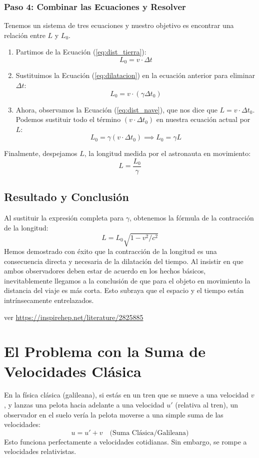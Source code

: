 \documentclass[11pt,a4paper]{article}
\begin{document}
\subsubsection*{Paso 4: Combinar las Ecuaciones y Resolver}
Tenemos un sistema de tres ecuaciones y nuestro objetivo es encontrar una relación entre $L$ y $L_0$.
\begin{enumerate}
    \item Partimos de la Ecuación (\ref{eq:dist_tierra}):
    \[ L_0 = v \cdot \Delta t \]
    \item Sustituimos la Ecuación (\ref{eq:dilatacion}) en la ecuación anterior para eliminar $\Delta t$:
    \[ L_0 = v \cdot (\gamma \Delta t_0) \]
    \item Ahora, observamos la Ecuación (\ref{eq:dist_nave}), que nos dice que $L = v \cdot \Delta t_0$. Podemos sustituir todo el término $(v \cdot \Delta t_0)$ en nuestra ecuación actual por $L$:
    \[ L_0 = \gamma (v \cdot \Delta t_0) \implies L_0 = \gamma L \]
\end{enumerate}
Finalmente, despejamos $L$, la longitud medida por el astronauta en movimiento:
\[ L = \frac{L_0}{\gamma} \]

\subsection*{Resultado y Conclusión}
Al sustituir la expresión completa para $\gamma$, obtenemos la fórmula de la contracción de la longitud:
\[ \boxed{ L = L_0 \sqrt{1 - v^2/c^2} } \]
Hemos demostrado con éxito que la contracción de la longitud es una consecuencia directa y necesaria de la dilatación del tiempo. Al insistir en que ambos observadores deben estar de acuerdo en los hechos básicos, inevitablemente llegamos a la conclusión de que para el objeto en movimiento la distancia del viaje es más corta. Esto subraya que el espacio y el tiempo están intrínsecamente entrelazados.


ver \url{https://inspirehep.net/literature/2825885}


\section{El Problema con la Suma de Velocidades Clásica}

En la física clásica (galileana), si estás en un tren que se mueve a una velocidad $v$, y lanzas una pelota hacia adelante a una velocidad $u'$ (relativa al tren), un observador en el suelo vería la pelota moverse a una simple suma de las velocidades:
\[ u = u' + v \quad \text{(Suma Clásica/Galileana)} \]
Esto funciona perfectamente a velocidades cotidianas. Sin embargo, se rompe a velocidades relativistas.
\end{document}
